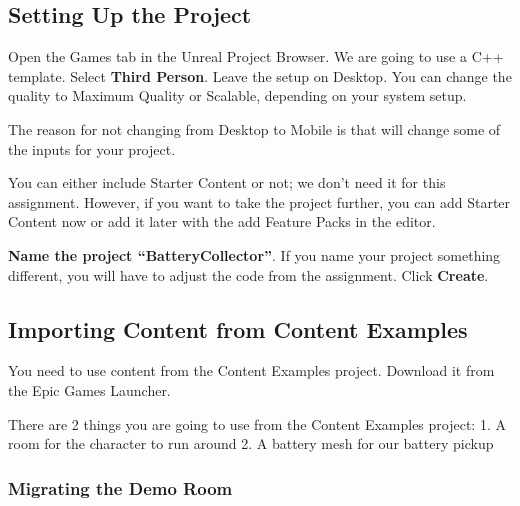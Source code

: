 \documentclass[
  letterpaper,
  DIV=11,
  numbers=noendperiod]{scrartcl}
\begin{document}
\subsection{Setting Up the Project}\label{setting-up-the-project}

Open the Games tab in the Unreal Project Browser. We are going to use a
C++ template. Select \textbf{Third Person}. Leave the setup on Desktop.
You can change the quality to Maximum Quality or Scalable, depending on
your system setup.

\begin{tcolorbox}[enhanced jigsaw, arc=.35mm, toprule=.15mm, breakable, rightrule=.15mm, leftrule=.75mm, bottomtitle=1mm, left=2mm, title=\textcolor{quarto-callout-important-color}{\faExclamation}\hspace{0.5em}{Important}, bottomrule=.15mm, colframe=quarto-callout-important-color-frame, colback=white, coltitle=black, toptitle=1mm, titlerule=0mm, colbacktitle=quarto-callout-important-color!10!white, opacitybacktitle=0.6, opacityback=0]

The reason for not changing from Desktop to Mobile is that will change
some of the inputs for your project.

\end{tcolorbox}

You can either include Starter Content or not; we don't need it for this
assignment. However, if you want to take the project further, you can
add Starter Content now or add it later with the add Feature Packs in
the editor.

\textbf{Name the project ``BatteryCollector''}. If you name your project
something different, you will have to adjust the code from the
assignment. Click \textbf{Create}.

\subsection{Importing Content from Content
Examples}\label{importing-content-from-content-examples}

You need to use content from the Content Examples project. Download it
from the Epic Games Launcher.

There are 2 things you are going to use from the Content Examples
project: 1. A room for the character to run around 2. A battery mesh for
our battery pickup

\subsubsection{Migrating the Demo Room}\label{migrating-the-demo-room}
\end{document}
